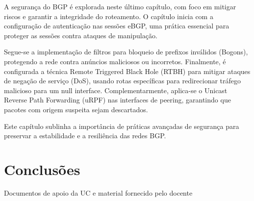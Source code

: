 \documentclass[11pt,english, openright, oneside]{book}
\begin{document}
A segurança do BGP é explorada neste último capítulo, com foco em mitigar riscos e garantir a integridade do roteamento. O capítulo inicia com a configuração de autenticação nas sessões eBGP, uma prática essencial para proteger as sessões contra ataques de manipulação. 

Segue-se a implementação de filtros para bloqueio de prefixos inválidos (Bogons), protegendo a rede contra anúncios maliciosos ou incorretos. Finalmente, é configurada a técnica Remote Triggered Black Hole (RTBH) para mitigar ataques de negação de serviço (DoS), usando rotas específicas para redirecionar tráfego malicioso para um null interface. Complementarmente, aplica-se o Unicast Reverse Path Forwarding (uRPF) nas interfaces de peering, garantindo que pacotes com origem suspeita sejam descartados. 

Este capítulo sublinha a importância de práticas avançadas de segurança para preservar a estabilidade e a resiliência das redes BGP.


\chapter{Conclusões}
\vspace{0.2cm}


\pagebreak

\begin{thebibliography}{4} %
   Documentos de apoio da UC e material fornecido pelo docente
\end{thebibliography}

\mainmatter
\end{document}
